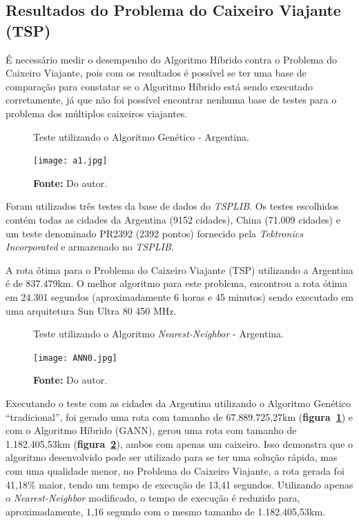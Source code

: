 \documentclass[12pt,openright,a4paper,twoside]{tcc}
\begin{document}
		\subsection{Resultados do Problema do Caixeiro Viajante (TSP)}

		É necessário medir o desempenho do Algoritmo Híbrido contra o Problema do Caixeiro Viajante, pois com os resultados é possível se ter uma base de comparação para constatar se o Algoritmo Híbrido está sendo executado corretamente, já que não foi possível encontrar nenhuma base de testes para o problema dos múltiplos caixeiros viajantes.

        \begin{figure}[h]
            \centering
            \caption{Teste utilizando o Algoritmo Genético - Argentina.}
            \texttt{[image: a1.jpg]}
            \caption*{\textbf{Fonte:} Do autor.}
            \label{figa1}
        \end{figure}

		Foram utilizados três testes da base de dados do \textit{TSPLIB}. Os testes escolhidos contém todas as cidades da Argentina (9152 cidades), China (71.009 cidades) e um teste denominado PR2392 (2392 pontos) fornecido pela \textit{Tektronics Incorporated} e armazenado no \textit{TSPLIB}. 

        A rota ótima para o Problema do Caixeiro Viajante (TSP) utilizando a Argentina é de 837.479km. O melhor algoritmo para este problema, encontrou a rota ótima em 24.301 segundos (aproximadamente 6 horas e 45 minutos) sendo executado em uma arquitetura Sun Ultra 80 450 MHz.

        \begin{figure}[h]
            \centering
            \caption{Teste utilizando o Algoritmo \textit{Nearest-Neighbor} - Argentina.}
            \texttt{[image: ANN0.jpg]}
            \caption*{\textbf{Fonte:} Do autor.}
            \label{figANN0}
        \end{figure}		

		Executando o teste com as cidades da Argentina utilizando o Algoritmo Genético ``tradicional'', foi gerado uma rota com tamanho de 67.889.725,27km (\textbf{figura~\ref{figa1}}) e com o Algoritmo Híbrido (GANN), gerou uma rota com tamanho de 1.182.405,53km (\textbf{figura~\ref{figANN0}}), ambos com apenas um caixeiro. Isso demonstra que o algoritmo desenvolvido pode ser utilizado para se ter uma solução rápida, mas com uma qualidade menor, no Problema do Caixeiro Viajante, a rota gerada foi 41,18\% maior, tendo um tempo de execução de 13,41 segundos. Utilizando apenas o \textit{Nearest-Neighbor} modificado, o tempo de execução é reduzido para, aproximadamente, 1,16 segundo com o mesmo tamanho de 1.182.405,53km.
\end{document}
